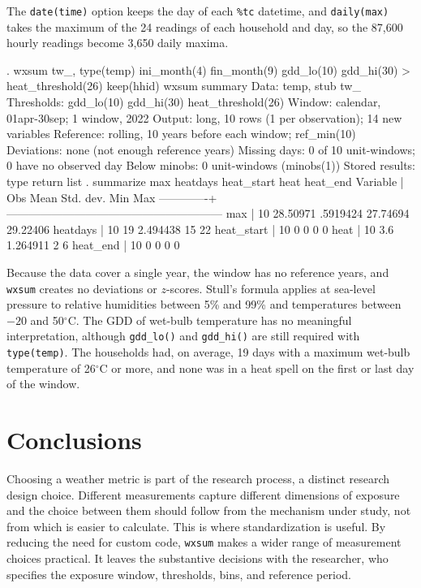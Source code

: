 \noindent The \texttt{date(time)} option keeps the day of each \texttt{\%tc} datetime, and \texttt{daily(max)} takes the maximum of the 24 readings of each household and day, so the 87,600 hourly readings become 3,650 daily maxima. 

\begin{stlog}
. wxsum tw_, type(temp) ini_month(4) fin_month(9) gdd_lo(10) gdd_hi(30)
> heat_threshold(26) keep(hhid)
{\smallskip}
wxsum summary
  Data:          temp, stub tw_
  Thresholds:    gdd_lo(10) gdd_hi(30) heat_threshold(26)
  Window:        calendar, 01apr-30sep; 1 window, 2022
  Output:        long, 10 rows (1 per observation); 14 new variables
  Reference:     rolling, 10 years before each window; ref_min(10)
  Deviations:    none (not enough reference years)
  Missing days:  0 of 10 unit-windows; 0 have no observed day
  Below minobs:  0 unit-windows (minobs(1))
  Stored results: type return list
{\smallskip}
. summarize max heatdays heat_start heat heat_end
{\smallskip}
    Variable |        Obs        Mean    Std. dev.       Min        Max
-------------+---------------------------------------------------------
         max |         10    28.50971    .5919424   27.74694   29.22406
    heatdays |         10          19    2.494438         15         22
  heat_start |         10           0           0          0          0
        heat |         10         3.6    1.264911          2          6
    heat_end |         10           0           0          0          0
\end{stlog}

\noindent Because the data cover a single year, the window has no reference years, and \texttt{wxsum} creates no deviations or $z$-scores. Stull's formula applies at sea-level pressure to relative humidities between 5\% and 99\% and temperatures between $-20$ and 50$^{\circ}$C. The GDD of wet-bulb temperature has no meaningful interpretation, although \texttt{gdd\_lo()} and \texttt{gdd\_hi()} are still required with \texttt{type(temp)}. The households had, on average, 19 days with a maximum wet-bulb temperature of 26$^{\circ}$C or more, and none was in a heat spell on the first or last day of the window.


\section{Conclusions}

Choosing a weather metric is part of the research process, a distinct research design choice. Different measurements capture different dimensions of exposure and the choice between them should follow from the mechanism under study, not from which is easier to calculate. This is where standardization is useful. By reducing the need for custom code, \texttt{wxsum} makes a wider range of measurement choices practical. It leaves the substantive decisions with the researcher, who specifies the exposure window, thresholds, bins, and reference period.

